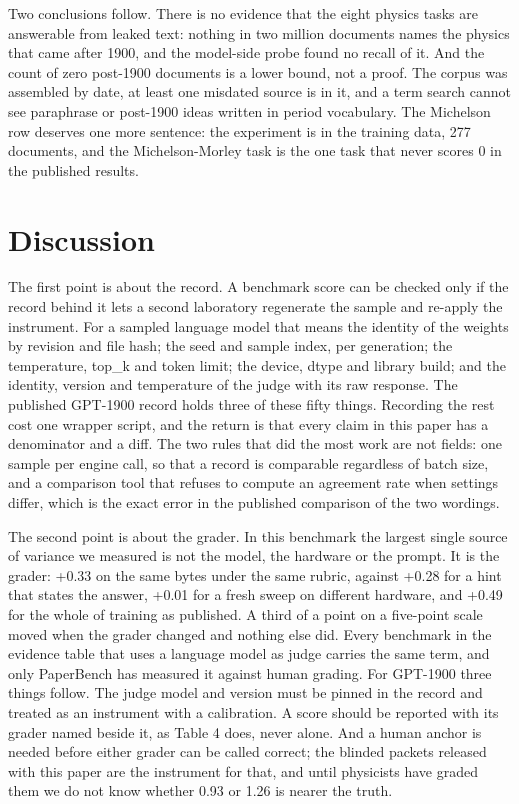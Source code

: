 \documentclass[reprint,prx,amsmath,amssymb,aps,superscriptaddress]{revtex4-2}
\begin{document}
Two conclusions follow. There is no evidence that the eight physics tasks are answerable from leaked text: nothing in two million documents names the physics that came after 1900, and the model-side probe found no recall of it. And the count of zero post-1900 documents is a lower bound, not a proof. The corpus was assembled by date, at least one misdated source is in it, and a term search cannot see paraphrase or post-1900 ideas written in period vocabulary. The Michelson row deserves one more sentence: the experiment is in the training data, 277 documents, and the Michelson-Morley task is the one task that never scores 0 in the published results.

\section{Discussion}

The first point is about the record. A benchmark score can be checked only if the record behind it lets a second laboratory regenerate the sample and re-apply the instrument. For a sampled language model that means the identity of the weights by revision and file hash; the seed and sample index, per generation; the temperature, top\_k and token limit; the device, dtype and library build; and the identity, version and temperature of the judge with its raw response. The published GPT-1900 record holds three of these fifty things. Recording the rest cost one wrapper script, and the return is that every claim in this paper has a denominator and a diff. The two rules that did the most work are not fields: one sample per engine call, so that a record is comparable regardless of batch size, and a comparison tool that refuses to compute an agreement rate when settings differ, which is the exact error in the published comparison of the two wordings.

The second point is about the grader. In this benchmark the largest single source of variance we measured is not the model, the hardware or the prompt. It is the grader: +0.33 on the same bytes under the same rubric, against +0.28 for a hint that states the answer, +0.01 for a fresh sweep on different hardware, and +0.49 for the whole of training as published. A third of a point on a five-point scale moved when the grader changed and nothing else did. Every benchmark in the evidence table that uses a language model as judge carries the same term, and only PaperBench has measured it against human grading. For GPT-1900 three things follow. The judge model and version must be pinned in the record and treated as an instrument with a calibration. A score should be reported with its grader named beside it, as Table 4 does, never alone. And a human anchor is needed before either grader can be called correct; the blinded packets released with this paper are the instrument for that, and until physicists have graded them we do not know whether 0.93 or 1.26 is nearer the truth.
\end{document}
